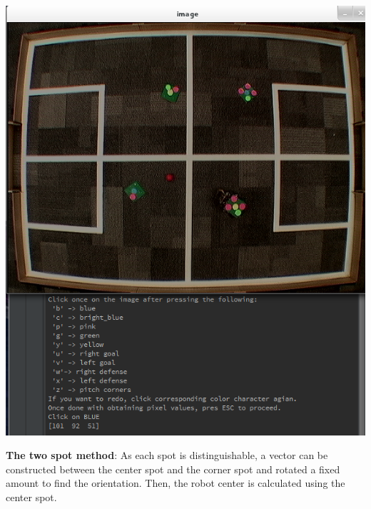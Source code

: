 \documentclass[a4paper,12pt]{article}
\begin{document}
~
\begin{minipage}{0.6\textwidth}
\includegraphics[scale=0.3]{images/calibration2.png}
\end{minipage}
\begin{minipage}{0.4\textwidth}
\textbf{The two spot method}: As each spot is distinguishable, a vector can be constructed between the center spot and the corner spot and rotated a fixed amount to find the orientation. Then, the robot center is calculated using the center spot. 
\end{minipage}
~
\end{document}
